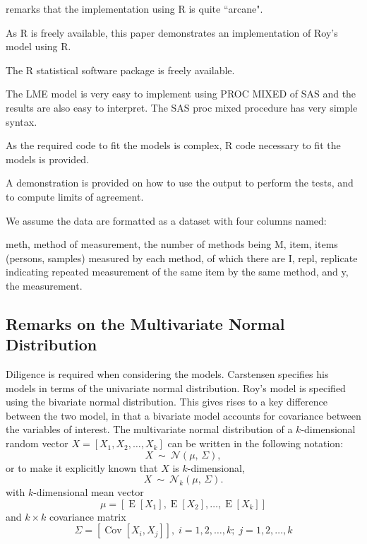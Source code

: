 \documentclass[12pt, a4paper]{report}
\theoremstyle{plain}
\theoremstyle{definition}
\theoremstyle{remark}
\begin{document}
\citet{BXC2008} remarks that the implementation using R is quite ``arcane".

As R is freely available, this paper demonstrates an implementation of Roy's model using R.

The R statistical software package is freely available.

The LME model is very easy to implement using PROC MIXED of SAS and the results are also easy to interpret.
The SAS proc mixed procedure has very simple syntax.

As the required code to fit the models is complex, R code necessary to fit the models is provided. 

A demonstration is provided on how to use the output to perform the tests, and to compute limits of agreement.



We assume the data are formatted as a dataset with four columns named:

meth, method of measurement, the number of methods being M,
item, items (persons, samples) measured by each method, of which there are I,
repl, replicate indicating repeated measurement of the same item by the same method, and
y, the measurement.








\subsection{Remarks on the Multivariate Normal Distribution}

Diligence is required when considering the models. Carstensen specifies his models in terms of the univariate normal distribution. Roy's model is specified using the bivariate normal distribution.
This gives rises to a key difference between the two model, in that a bivariate model accounts for covariance between the variables of interest.
The multivariate normal distribution of a $k$-dimensional random vector $X = [X_1, X_2, \ldots, X_k]$
can be written in the following notation:
\[
X\ \sim\ \mathcal{N}(\mu,\, \Sigma),
\]
or to make it explicitly known that $X$ is $k$-dimensional,
\[
X\ \sim\ \mathcal{N}_k(\mu,\, \Sigma).
\]
with $k$-dimensional mean vector
\[ \mu = [ \operatorname{E}[X_1], \operatorname{E}[X_2], \ldots, \operatorname{E}[X_k]] \]
and $k \times k$ covariance matrix
\[ \Sigma = [\operatorname{Cov}[X_i, X_j]], \; i=1,2,\ldots,k; \; j=1,2,\ldots,k \]
\end{document}
